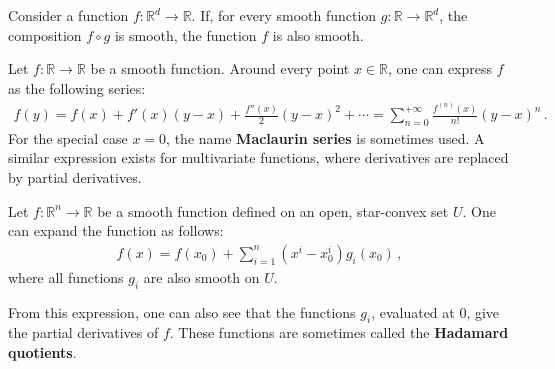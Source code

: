 
    \begin{theorem}[Boman]
        Consider a function $f:\mathbb{R}^d\rightarrow\mathbb{R}$. If, for every smooth function $g:\mathbb{R}\rightarrow\mathbb{R}^d$, the composition $f\circ g$ is smooth, the function $f$ is also smooth.
    \end{theorem}

    \begin{property}
        Let $f:\mathbb{R}\rightarrow\mathbb{R}$ be a smooth function. Around every point $x\in\mathbb{R}$, one can express $f$ as the following series:
        \begin{gather}
            f(y) = f(x) + f'(x)(y-x) + \frac{f''(x)}{2}(y-x)^2 + \cdots = \sum_{n=0}^{+\infty}\frac{f^{(n)}(x)}{n!}(y-x)^n\,.
        \end{gather}
        For the special case $x=0$, the name \textbf{Maclaurin series} is sometimes used. A similar expression exists for multivariate functions, where derivatives are replaced by partial derivatives.
    \end{property}


    \begin{theorem}
        Let $f:\mathbb{R}^n\rightarrow\mathbb{R}$ be a smooth function defined on an open, star-convex set $U$. One can expand the function as follows:
        \begin{gather}
            f(x) = f(x_0) + \sum_{i=1}^n(x^i-x^i_0)g_i(x_0)\,,
        \end{gather}
        where all functions $g_i$ are also smooth on $U$.
    \end{theorem}
    From this expression, one can also see that the functions $g_i$, evaluated at 0, give the partial derivatives of $f$. These functions are sometimes called the \textbf{Hadamard quotients}.

